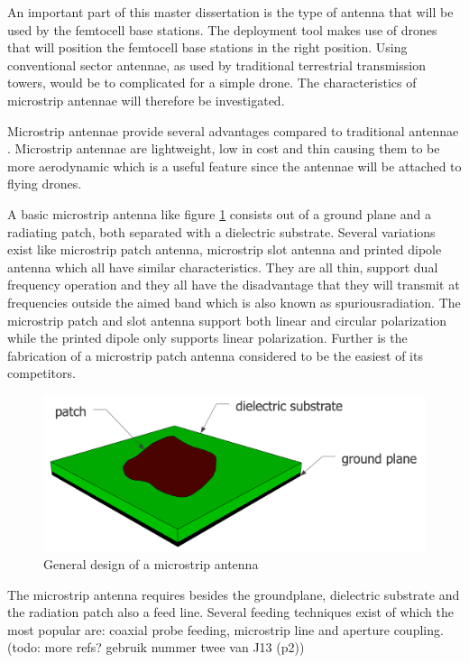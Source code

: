 An important part of this master dissertation is the type of antenna that will be used by the femtocell base stations. The deployment tool makes use
of drones that will position the femtocell base stations in the right position.  Using conventional 
sector antennae, as used by traditional terrestrial transmission towers, would be to complicated for a simple drone. 
The characteristics of microstrip antennae will therefore be investigated.

Microstrip antennae provide several advantages compared to traditional antennae \cite{J13_singh2011micro, J14_antennadesign}. Microstrip antennae
are lightweight, low in cost and thin causing them to be more aerodynamic which is a useful feature since the antennae will be attached
to flying drones.

A basic microstrip antenna like figure \ref{fig:basicpatchantenna} consists out of a ground plane and
a radiating patch, both separated with a dielectric substrate. Several variations exist like microstrip patch antenna, microstrip slot antenna and printed dipole antenna which
all have similar characteristics. They are all thin, support dual frequency operation and they all have the disadvantage that they 
will transmit at frequencies outside the aimed band which is also known as
\gls{spuriousradiation}. The microstrip patch and slot antenna support both linear
and circular polarization while the printed dipole only supports linear polarization. Further is the fabrication of a microstrip patch antenna considered to be the easiest of its competitors. 

\begin{figure}[H]
\centering
  \includegraphics[width=\textwidth/2]{../images/patchantenna.png}
  \caption{General design of a microstrip antenna}
  \label{fig:basicpatchantenna}
\end{figure}

The microstrip antenna requires besides the groundplane, dielectric substrate and the radiation patch also a feed line. Several feeding techniques exist of which the most popular are: coaxial probe feeding, microstrip line and aperture coupling. %
(todo: more refs? gebruik nummer twee van J13 (p2))

